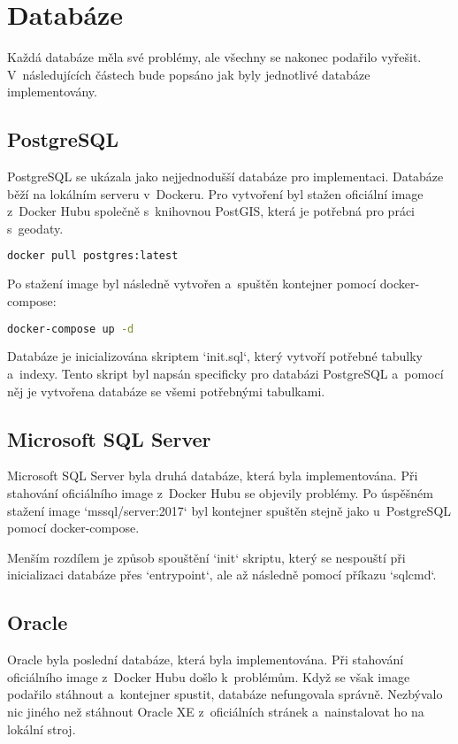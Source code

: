 \section{Databáze}
Každá databáze měla své problémy, ale všechny se nakonec podařilo vyřešit.  
V~následujících částech bude popsáno jak byly jednotlivé databáze implementovány.

\subsection{PostgreSQL}
PostgreSQL se ukázala jako nejjednodušší databáze pro implementaci.  
Databáze běží na lokálním serveru v~Dockeru.  
Pro vytvoření byl stažen oficiální image z~Docker Hubu  
společně s~knihovnou PostGIS, která je potřebná pro práci s~geodaty.

\begin{lstlisting}[language=bash]
docker pull postgres:latest
\end{lstlisting}

Po stažení image byl následně vytvořen a~spuštěn kontejner pomocí docker-compose:

\begin{lstlisting}[language=bash]
docker-compose up -d
\end{lstlisting}

Databáze je inicializována skriptem `init.sql`, který vytvoří potřebné tabulky a~indexy.  
Tento skript byl napsán specificky pro databázi PostgreSQL a~pomocí něj je vytvořena databáze  
se všemi potřebnými tabulkami.

\subsection{Microsoft SQL Server}

Microsoft SQL Server byla druhá databáze, která byla implementována.  
Při stahování oficiálního image z~Docker Hubu se objevily problémy.  
Po úspěšném stažení image `mssql/server:2017` byl kontejner spuštěn stejně jako u~PostgreSQL  
pomocí docker-compose.

Menším rozdílem je způsob spouštění `init` skriptu, který se nespouští při inicializaci databáze  
přes `entrypoint`, ale až následně pomocí příkazu `sqlcmd`.

\newpage

\subsection{Oracle}
Oracle byla poslední databáze, která byla implementována.  
Při stahování oficiálního image z~Docker Hubu došlo k~problémům.  
Když se však image podařilo stáhnout a~kontejner spustit, databáze nefungovala správně.  
Nezbývalo nic jiného než stáhnout Oracle XE z~oficiálních stránek a~nainstalovat ho na lokální stroj.  

